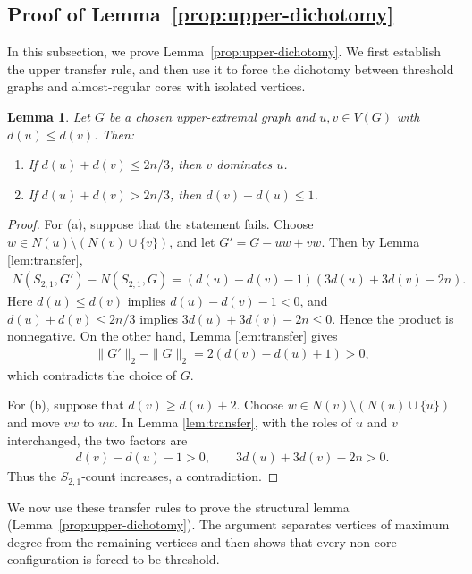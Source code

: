 \documentclass[10pt,a4paper]{article}
\newtheorem{lemma}[definition]{Lemma}
\newcommand{\normsq}[1]{\|#1\|_2}
\begin{document}
\subsection{Proof of Lemma~\ref{prop:upper-dichotomy}}\label{subsec:prove-lemma3.1}
In this subsection, we prove Lemma~\ref{prop:upper-dichotomy}. We first establish the upper transfer rule,  and then use it to force the 
dichotomy between threshold graphs and almost-regular cores with isolated 
vertices.
\begin{lemma}\label{lem:upper-transfer}
    Let $G$ be a chosen upper-extremal graph and $u,v\in V(G)$ with $d(u)\le d(v)$.  Then:
    \begin{enumerate}[label=\textup{(\alph*)}]
        \item If  $d(u)+d(v)\le 2n/3$, then $v$ dominates $u$.
        \item If $d(u)+d(v)>2n/3$, then $d(v)-d(u)\le1$.
    \end{enumerate}
\end{lemma}

\begin{proof}
    For (a), suppose that the statement fails. Choose $w\in N(u)\setminus (N(v)\cup\{v\})$, and let $G'=G-uw+vw$. Then by Lemma \ref{lem:transfer},
    \begin{align*}
      N(S_{2,1},G')-N(S_{2,1},G)=(d(u)-d(v)-1)(3d(u)+3d(v)-2n).
    \end{align*}
Here $d(u)\le d(v)$ implies $d(u)-d(v)-1<0$, and $d(u)+d(v)\le2n/3$ implies $3d(u)+3d(v)-2n\le0$.  Hence the product is nonnegative.   On the other hand,  Lemma \ref{lem:transfer} gives
    \begin{align*}
      \normsq{G'}-\normsq{G}=2(d(v)-d(u)+1)>0, 
    \end{align*}
which contradicts the choice of $G$.
    
    For (b), suppose that $d(v)\ge d(u)+2$.  Choose $w\in N(v)\setminus (N(u)\cup\{u\})$ and move $vw$ to $uw$.  In Lemma \ref{lem:transfer}, with the roles of $u$ and $v$ interchanged, the two factors are
    \begin{align*}
      d(v)-d(u)-1>0,
      \qquad
      3d(u)+3d(v)-2n>0.
    \end{align*}
    Thus the $S_{2,1}$-count increases, a contradiction.
\end{proof}


We now use these transfer rules to prove the structural lemma (Lemma~\ref{prop:upper-dichotomy}). The 
argument separates vertices of maximum degree from the remaining 
vertices and then shows that every non-core configuration is forced to 
be threshold.
\end{document}
